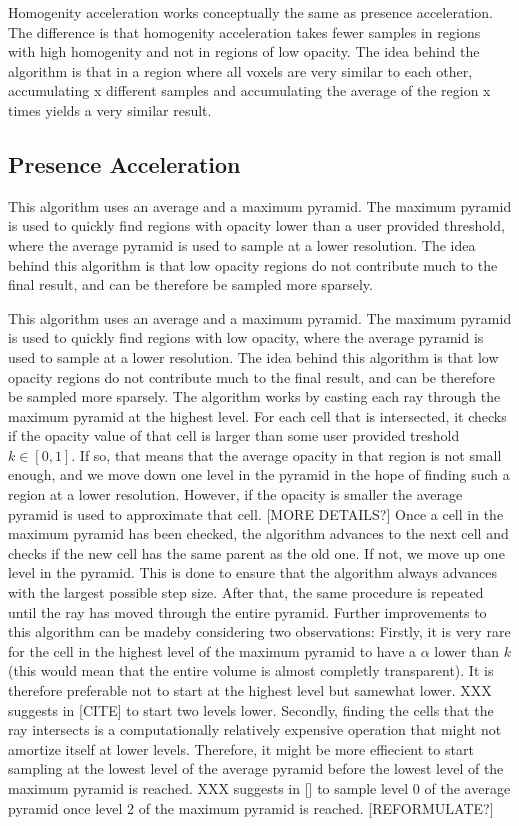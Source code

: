 {Homogenity acceleration works conceptually the same as presence acceleration. The difference is that homogenity acceleration takes fewer samples in regions with high homogenity and not in regions of low opacity. The idea behind the algorithm is that in a region where all voxels are very similar to each other, accumulating x different samples and accumulating the average of the region x times yields a very similar result.
\subsection{Presence Acceleration}
This algorithm uses an average and a maximum pyramid. The maximum pyramid is used to quickly find regions with opacity lower than a user provided threshold, where the average pyramid is used to sample at a lower resolution. The idea behind this algorithm is that low opacity regions do not contribute much to the final result, and can be therefore be sampled more sparsely.

This algorithm uses an average and a maximum pyramid. The maximum pyramid is used to quickly find regions with low opacity, where the average pyramid is used to sample at a lower resolution. The idea behind this algorithm is that low opacity regions do not contribute much to the final result, and can be therefore be sampled more sparsely.
The algorithm works by casting each ray through the maximum pyramid at the highest level. For each cell that is intersected, it checks if the opacity value of that cell is larger than some user provided treshold $k \in [0, 1]$.
If so, that means that the average opacity in that region is not small enough, and we move down one level in the pyramid in the hope of finding such a region at a lower resolution.
However, if the opacity is smaller the average pyramid is used to approximate that cell. [MORE DETAILS?]
Once a cell in the maximum pyramid has been checked, the algorithm advances to the next cell and checks if the new cell has the same parent as the old one. If not, we move up one level in the pyramid. This is done to ensure that the algorithm always advances with the largest possible step size.
After that, the same procedure is repeated until the ray has moved through the entire pyramid.
Further improvements to this algorithm can be madeby considering two observations:
Firstly, it is very rare for the cell in the highest level of the maximum pyramid to have a $\alpha$ lower than $k$ (this would mean that the entire volume is almost completly transparent). It is therefore preferable not to start at the highest level but samewhat lower. XXX suggests in [CITE] to start two levels lower.
Secondly, finding the cells that the ray intersects is a computationally relatively expensive operation that might not amortize itself at lower levels. Therefore, it might be more effiecient to start sampling at the lowest level of the average pyramid before the lowest level of the maximum pyramid is reached. XXX suggests in [] to sample level 0  of the average pyramid once level 2 of the maximum pyramid is reached. [REFORMULATE?]



}
